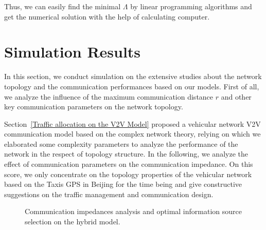 \documentclass[journal,12pt,draftclsnofoot,onecolumn]{IEEEtran}
\begin{document}
Thus, we can easily find the minimal $\Lambda$ by linear programming algorithms and get the numerical solution with the help of calculating computer.


\section{Simulation Results}
\label{Simulation Results}

In this section, we conduct simulation on the extensive studies about the network topology and the communication performances based on our models.
First of all, we analyze the influence of the maximum communication distance $r$ and other key communication parameters on the network topology.

Section~\ref{Traffic allocation on the V2V Model} proposed a vehicular network V2V communication model based on the complex network theory, relying on which we elaborated some complexity parameters to analyze the performance of the network in the respect of topology structure. In the following, we analyze the effect of communication parameters on the communication impedance. On this score, we only concentrate on the topology properties of the vehicular network based on the Taxis GPS in Beijing for the time being and give constructive suggestions on the traffic management and communication design.

\begin{figure*}[!t]
\begin{center}
  \hspace{0.05in}
  \hspace{0.05in}
\hspace{0.05in}
\caption{Communication impedances analysis and optimal information source selection on the hybrid model.}
\label{123}
\vspace{-7mm}
\end{center}
\end{figure*}
\end{document}
